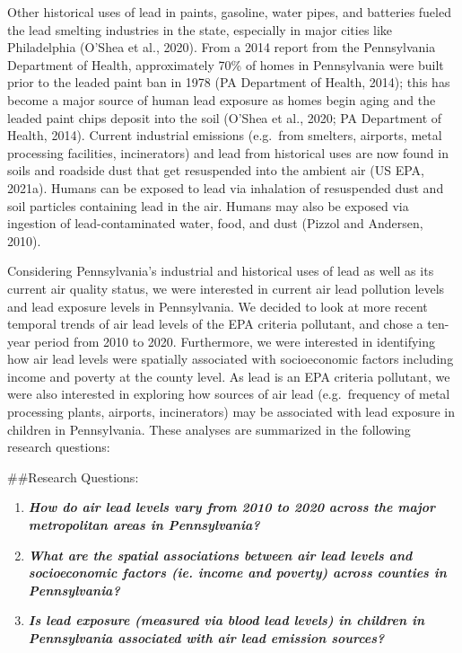 \documentclass[
  12pt,
]{article}
\begin{document}
Other historical uses of lead in paints, gasoline, water pipes, and
batteries fueled the lead smelting industries in the state, especially
in major cities like Philadelphia (O'Shea et al., 2020). From a 2014
report from the Pennsylvania Department of Health, approximately 70\% of
homes in Pennsylvania were built prior to the leaded paint ban in 1978
(PA Department of Health, 2014); this has become a major source of human
lead exposure as homes begin aging and the leaded paint chips deposit
into the soil (O'Shea et al., 2020; PA Department of Health, 2014).
Current industrial emissions (e.g.~from smelters, airports, metal
processing facilities, incinerators) and lead from historical uses are
now found in soils and roadside dust that get resuspended into the
ambient air (US EPA, 2021a). Humans can be exposed to lead via
inhalation of resuspended dust and soil particles containing lead in the
air. Humans may also be exposed via ingestion of lead-contaminated
water, food, and dust (Pizzol and Andersen, 2010).

Considering Pennsylvania's industrial and historical uses of lead as
well as its current air quality status, we were interested in current
air lead pollution levels and lead exposure levels in Pennsylvania. We
decided to look at more recent temporal trends of air lead levels of the
EPA criteria pollutant, and chose a ten-year period from 2010 to 2020.
Furthermore, we were interested in identifying how air lead levels were
spatially associated with socioeconomic factors including income and
poverty at the county level. As lead is an EPA criteria pollutant, we
were also interested in exploring how sources of air lead
(e.g.~frequency of metal processing plants, airports, incinerators) may
be associated with lead exposure in children in Pennsylvania. These
analyses are summarized in the following research questions:

\#\#Research Questions:

\begin{enumerate}
\def\labelenumi{\arabic{enumi}.}
\item
  \textbf{\emph{How do air lead levels vary from 2010 to 2020 across the
  major metropolitan areas in Pennsylvania?}}
\item
  \textbf{\emph{What are the spatial associations between air lead
  levels and socioeconomic factors (ie. income and poverty) across
  counties in Pennsylvania?}}
\item
  \textbf{\emph{Is lead exposure (measured via blood lead levels) in
  children in Pennsylvania associated with air lead emission sources?}}
\end{enumerate}
\end{document}
